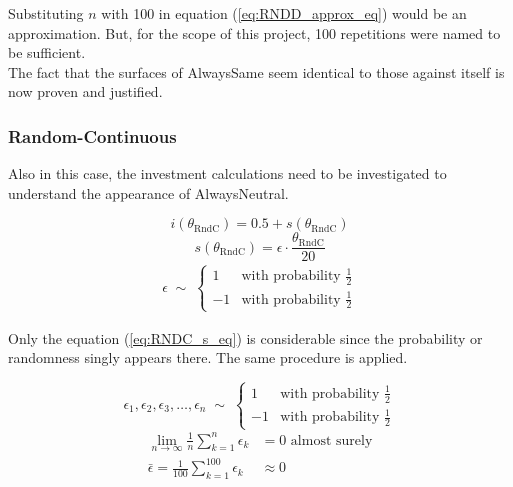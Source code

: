 \documentclass{article}
\begin{document}
	Substituting $n$ with 100 in equation (\ref{eq:RNDD_approx_eq}) would be an approximation.
	But, for the scope of this project, 100 repetitions were named to be sufficient.\\
	The fact that the surfaces of AlwaysSame seem identical to those against itself is now proven and justified.
	
\subsubsection*{Random-Continuous}

	Also in this case, the investment calculations need to be investigated to understand the appearance of AlwaysNeutral.

	\begin{equation}
		i(\theta_{\mathrm{RndC}}) = 0.5 + s(\theta_{\mathrm{RndC}})
		\label{eq:RNDC_i_eq}
	\end{equation}
	\begin{equation}
		s(\theta_{\mathrm{RndC}}) = \epsilon \cdot \frac{\theta_{\mathrm{RndC}}}{20}
		\label{eq:RNDC_s_eq}
	\end{equation}
	\begin{equation}
		\begin{split}
		\epsilon \;\sim\;
		\begin{cases}
		  1 & \text{with probability } \frac{1}{2}\\
		 -1 & \text{with probability } \frac{1}{2} 
		\end{cases}
		\label{eq:prob_eps}
		\end{split}
	\end{equation}

	Only the equation (\ref{eq:RNDC_s_eq}) is considerable since the probability or randomness singly appears there.
	The same procedure is applied.

	\begin{equation}
		\epsilon_1, \epsilon_2, \epsilon_3, \dots, \epsilon_n \;\sim\; 
		\begin{cases}
		  1 & \text{with probability } \frac{1}{2}\\
		 -1 & \text{with probability } \frac{1}{2} 
		\end{cases}
		\label{eq:RNDC_n_i}
	\end{equation}
	\begin{equation}
		\begin{split}
			\lim_{n\to\infty} \frac{1}{n} \sum_{k=1}^{n} \epsilon_k &= 0 \text{ almost surely}\\
			\bar \epsilon = \frac{1}{100} \sum_{k=1}^{100} \epsilon_k &\approx 0
		\label{eq:RNDC_approx_eq}
		\end{split}
	\end{equation}
\end{document}
